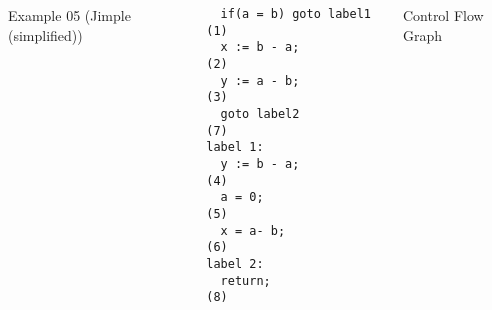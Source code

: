 \begin{frame}[fragile]
    \begin{columns}
Example 05 (Jimple (simplified))
    
\begin{verbatim}
  if(a = b) goto label1 (1)
  x := b - a;           (2)
  y := a - b;           (3)
  goto label2           (7)
label 1:
  y := b - a;           (4) 
  a = 0;                (5) 
  x = a- b;             (6)
label 2:
  return;               (8)
\end{verbatim}

Control Flow Graph

\end{columns}
  
\end{frame}




